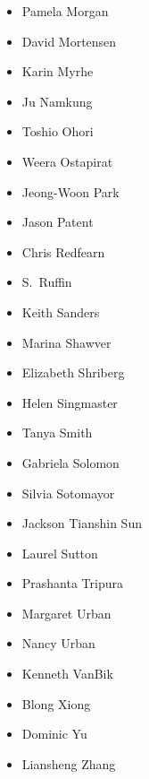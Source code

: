 \begin{multicols}{3}
\begin{itemize}
\item Pamela Morgan
\item David Mortensen
\item Karin Myrhe
\item Ju Namkung
\item Toshio Ohori
\item Weera Ostapirat
\item Jeong-Woon Park
\item Jason Patent
\item Chris Redfearn
\item S.\ Ruffin
\item Keith Sanders
\item Marina Shawver
\item Elizabeth Shriberg
\item Helen Singmaster
\item Tanya Smith
\item Gabriela Solomon
\item Silvia Sotomayor
\item Jackson Tianshin Sun
\item Laurel Sutton
\item Prashanta Tripura
\item Margaret Urban
\item Nancy Urban
\item Kenneth VanBik
\item Blong Xiong
\item Dominic Yu
\item Liansheng Zhang
\end{itemize}
\end{multicols}
